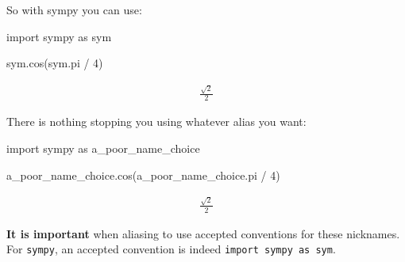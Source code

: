 

So with sympy you can use:




\begin{pyin}
import sympy as sym

sym.cos(sym.pi / 4)
\end{pyin}




\begin{equation*}
\begin{split}\displaystyle \frac{\sqrt{2}}{2}\end{split}
\end{equation*}




There is nothing stopping you using whatever alias you want:




\begin{pyin}
import sympy as a_poor_name_choice

a_poor_name_choice.cos(a_poor_name_choice.pi / 4)
\end{pyin}




\begin{equation*}
\begin{split}\displaystyle \frac{\sqrt{2}}{2}\end{split}
\end{equation*}

\textbf{It is important} when aliasing to use accepted conventions for these
nicknames. For \texttt{sympy}, an accepted convention is indeed \texttt{import sympy as sym}.
